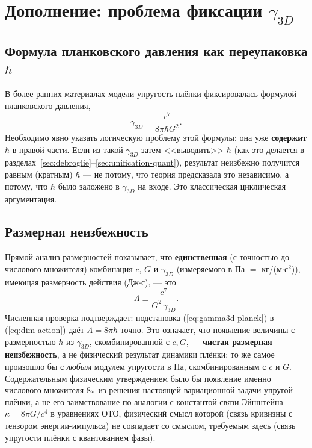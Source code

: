 \documentclass[12pt,a4paper]{article}
\begin{document}
\section{Дополнение: проблема фиксации $\gamma_{3D}$}
\label{sec:gamma3d-problem}

\subsection{Формула планковского давления как переупаковка $\hbar$}

В более ранних материалах модели упругость плёнки фиксировалась формулой
планковского давления,
\begin{equation}
\gamma_{3D} = \frac{c^7}{8\pi\hbar G^2}.
\label{eq:gamma3d-planck}
\end{equation}
Необходимо явно указать логическую проблему этой формулы: она уже
\textbf{содержит} $\hbar$ в правой части. Если из такой $\gamma_{3D}$
затем <<выводить>> $\hbar$ (как это делается в
разделах~\ref{sec:debroglie}--\ref{sec:unification-quant}), результат
неизбежно получится равным (кратным) $\hbar$ --- не потому, что теория
предсказала это независимо, а потому, что $\hbar$ было заложено в
$\gamma_{3D}$ на входе. Это классическая циклическая аргументация.

\subsection{Размерная неизбежность}

Прямой анализ размерностей показывает, что \textbf{единственная}
(с точностью до числового множителя) комбинация $c$, $G$ и $\gamma_{3D}$
(измеряемого в Па $=$ кг/(м$\cdot$с$^2$)), имеющая размерность действия
(Дж$\cdot$с), --- это
\begin{equation}
\Lambda \equiv \frac{c^7}{G^2\,\gamma_{3D}}.
\label{eq:dim-action}
\end{equation}
Численная проверка подтверждает: подстановка (\ref{eq:gamma3d-planck}) в
(\ref{eq:dim-action}) даёт $\Lambda=8\pi\hbar$ точно. Это означает, что
появление величины с размерностью $\hbar$ из $\gamma_{3D}$, скомбинированной
с $c,G$, --- \textbf{чистая размерная неизбежность}, а не физический
результат динамики плёнки: то же самое произошло бы с \emph{любым}
модулем упругости в Па, скомбинированным с $c$ и $G$. Содержательным
физическим утверждением было бы появление именно числового множителя
$8\pi$ из решения настоящей вариационной задачи упругой плёнки, а не его
заимствование по аналогии с константой связи Эйнштейна
$\kappa=8\pi G/c^4$ в уравнениях ОТО, физический смысл которой (связь
кривизны с тензором энергии-импульса) не совпадает со смыслом,
требуемым здесь (связь упругости плёнки с квантованием фазы).
\end{document}
